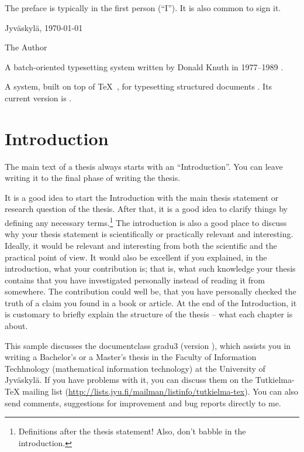 \documentclass[utf8,bachelor,english]{gradu3}
\begin{document}
The preface is typically in the first person (``I'').  It is also common
to sign it.

Jyväskylä, \today

\bigskip

The Author

\begin{thetermlist}
\item[\TeX] A batch-oriented typesetting system written by 
Donald Knuth in 1977--1989 \parencite[see][]{knuth86:_texbook}. 
\item[\LaTeX] A system, built on top of \TeX\
  \parencite{knuth86:_texbook}, for typesetting structured
  documents \parencite[see][]{lamport94:_latex}.  Its current version
  is \LaTeXe.
\end{thetermlist}

\mainmatter

\chapter{Introduction}

The main text of a thesis always starts with an ``Introduction''.
You can leave writing it to the final phase of writing the thesis.

It is a good idea to start the Introduction with the main thesis
statement or research question of the thesis.  After that, it is a
good idea to clarify things by defining any necessary
terms.\footnote{Definitions after the thesis statement!  Also, don't
  babble in the introduction.}  The introduction is also a good place
to discuss why your thesis statement is scientifically or practically
relevant and interesting.  Ideally, it would be relevant and
interesting from both the scientific and the practical point of view.
It would also be excellent if you explained, in the introduction, what
your contribution is; that is, what such knowledge your thesis
contains that you have investigated personally instead of reading it
from somewhere.  The contribution could well be, that you have
personally checked the truth of a claim you found in a book or
article.  At the end of the Introduction, it is customary to briefly
explain the structure of the thesis -- what each chapter is about.

This sample discusses the documentclass gradu3 (version
\graduclsversion), which assists you in writing a Bachelor's or a
Master's thesis in the Faculty of Information Techhnology
(mathematical information technology) at the University of Jyväskylä.
If you have problems with it, you can discuss them on the
Tutkielma-TeX mailing list
(\url{http://lists.jyu.fi/mailman/listinfo/tutkielma-tex}).  You can
also send comments, suggestions for improvement and bug reports
directly to me.
\end{document}
